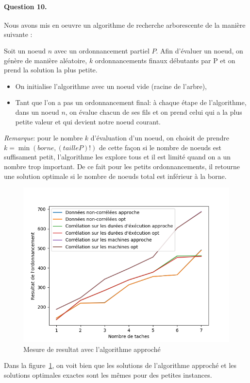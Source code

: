 \documentclass[a4paper, 10pt]{article}
\begin{document}
         \paragraph{Question 10.}{Nous avons mis en oeuvre un algorithme de recherche arborescente de la manière suivante :
         
Soit un noeud $n$ avec un ordonnancement partiel $P$. Afin d'évaluer un noeud, on génère de manière aléatoire, $k$ ordonnancements finaux débutants par P et on prend la solution la plus petite.
	\begin{itemize}
    		\item On initialise l'algorithme avec un noeud vide (racine de l'arbre),
        \item Tant que l'on a pas un ordonnancement final: à chaque étape de l'algorithme, dans un noeud $n$, on évalue chacun de ses fils et on prend celui qui a la plus petite valeur et qui devient notre noeud courant.
    \end{itemize}
    
        \emph{Remarque}: pour le nombre $k$ d'évaluation d'un noeud, on choisit de prendre $k = \min(borne,(taille P)!)$ de cette façon si le nombre de noeuds est suffisament petit, l'algorithme les explore tous et il est limité quand on a un nombre trop important. De ce fait pour les petits ordonnancements, il retourne une solution optimale si le nombre de noeuds total est inférieur à la borne.

        \begin{figure}[h]
		\centering
		\includegraphics[width=0.75\linewidth]{graphes/res_greed.png}
		\caption{Mesure de resultat avec l'algorithme approché}
		\label{fig:res_greed}
	\end{figure}
	Dans la figure~\ref{fig:res_greed}, on voit bien que les solutions de l'algorithme approché et les solutions optimales exactes sont les mêmes pour des petites instances.
}
	
\end{document}

